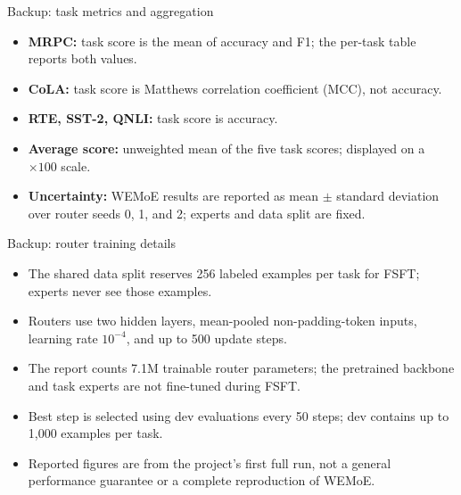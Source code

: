 \documentclass[aspectratio=169,10pt]{beamer}
\begin{document}
\begin{frame}{Backup: task metrics and aggregation}
  \begin{itemize}
    \item \textbf{MRPC:} task score is the mean of accuracy and F1; the per-task table reports both values.
    \item \textbf{CoLA:} task score is Matthews correlation coefficient (MCC), not accuracy.
    \item \textbf{RTE, SST-2, QNLI:} task score is accuracy.
    \item \textbf{Average score:} unweighted mean of the five task scores; displayed on a $\times 100$ scale.
    \item \textbf{Uncertainty:} WEMoE results are reported as mean $\pm$ standard deviation over router seeds 0, 1, and 2; experts and data split are fixed.
  \end{itemize}
\end{frame}

\begin{frame}{Backup: router training details}
  \begin{itemize}
    \item The shared data split reserves 256 labeled examples per task for FSFT; experts never see those examples.
    \item Routers use two hidden layers, mean-pooled non-padding-token inputs, learning rate $10^{-4}$, and up to 500 update steps.
    \item The report counts 7.1M trainable router parameters; the pretrained backbone and task experts are not fine-tuned during FSFT.
    \item Best step is selected using dev evaluations every 50 steps; dev contains up to 1,000 examples per task.
    \item Reported figures are from the project's first full run, not a general performance guarantee or a complete reproduction of WEMoE.
  \end{itemize}
\end{frame}

\begin{hustreferencesframe}[title={References},subtitle={}]
\end{hustreferencesframe}
\end{document}
